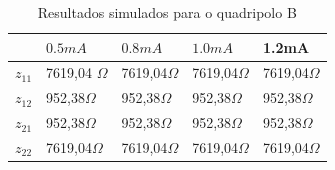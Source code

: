 \begin{table}[!ht]
\centering
\caption{Resultados simulados para o quadripolo B}

\begin{tabular}{l|l|l|l|l}
      & $0.5mA$                      & $0.8mA$ & $1.0mA$ & \multicolumn{1}{l}{1.2mA}  \\ 
\hline
$z_{11}$ & 7619,04 $\Omega$ & 7619,04$\Omega$  & 7619,04$\Omega$ & 7619,04$\Omega$                    \\ 
\hline
$z_{12}$ & 952,38$\Omega$  & 952,38$\Omega$  & 952,38$\Omega$  & 952,38$\Omega$                       \\ 
\hline
$z_{21}$ & 952,38$\Omega$  & 952,38$\Omega$  & 952,38$\Omega$  & 952,38$\Omega$                       \\ 
\hline
$z_{22}$ & 7619,04$\Omega$  & 7619,04$\Omega$  & 7619,04$\Omega$  & 7619,04$\Omega$                       \\
\end{tabular}
\end{table}
